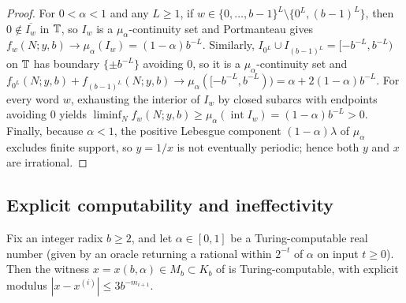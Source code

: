 \documentclass[11pt]{article}
\begin{document}
\begin{proof}
For $0<\alpha<1$ and any $L\ge1$, if $w\in\{0,\dots,b-1\}^L\setminus\{0^L,(b-1)^L\}$, then $0\notin\overline{I_w}$ in $\mathbb T$, so $I_w$ is a $\mu_\alpha$-continuity set and Portmanteau gives $f_w(N;y,b)\to\mu_\alpha(I_w)=(1-\alpha)b^{-L}$. Similarly, $I_{0^L}\cup I_{(b-1)^L}=[-b^{-L},b^{-L})$ on $\mathbb T$ has boundary $\{\pm b^{-L}\}$ avoiding $0$, so it is a $\mu_\alpha$-continuity set and $f_{0^L}(N;y,b)+f_{(b-1)^L}(N;y,b)\to\mu_\alpha([-b^{-L},b^{-L}))=\alpha+2(1-\alpha)b^{-L}$. For every word $w$, exhausting the interior of $I_w$ by closed subarcs with endpoints avoiding $0$ yields $\liminf_N f_w(N;y,b)\ge\mu_\alpha(\operatorname{int}I_w)=(1-\alpha)b^{-L}>0$. Finally, because $\alpha<1$, the positive Lebesgue component $(1-\alpha)\lambda$ of $\mu_\alpha$ excludes finite support, so $y=1/x$ is not eventually periodic; hence both $y$ and $x$ are irrational.
\end{proof}

\subsection{Explicit computability and ineffectivity}

\begin{proposition}\label{prop:computable}
Fix an integer radix $b\ge2$, and let $\alpha\in[0,1]$ be a Turing-computable real number (given by an oracle returning a rational within $2^{-t}$ of $\alpha$ on input $t\ge0$). Then the witness $x=x(b,\alpha)\in M_b\subset K_b$ of  is Turing-computable, with explicit modulus $|x-x^{(i)}|\le 3b^{-m_{i+1}}$.
\end{proposition}
\end{document}

